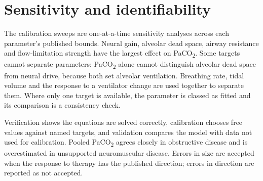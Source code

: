 \section{Sensitivity and identifiability}
\label{sec:val-sens}
The calibration sweeps are one-at-a-time sensitivity analyses across each parameter's published bounds. Neural gain, alveolar dead space, airway resistance and flow-limitation strength have the largest effect on PaCO\textsubscript{2}. Some targets cannot separate parameters: PaCO\textsubscript{2} alone cannot distinguish alveolar dead space from neural drive, because both set alveolar ventilation. Breathing rate, tidal volume and the response to a ventilator change are used together to separate them. Where only one target is available, the parameter is classed as fitted and its comparison is a consistency check.

\begin{summarybox}
Verification shows the equations are solved correctly, calibration chooses free values against named targets, and validation compares the model with data not used for calibration. Pooled PaCO\textsubscript{2} agrees closely in obstructive disease and is overestimated in unsupported neuromuscular disease. Errors in size are accepted when the response to therapy has the published direction; errors in direction are reported as not accepted.
\end{summarybox}
